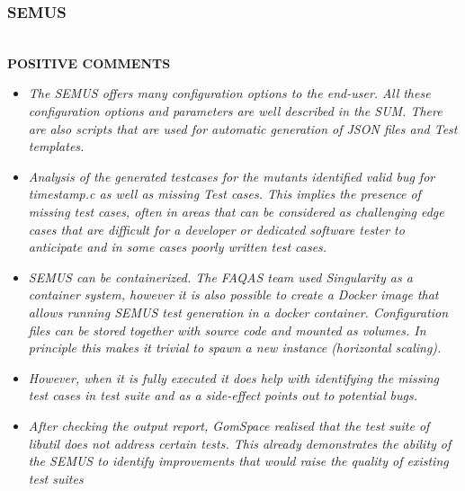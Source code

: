 \subsubsection{SEMUS} \ \\



\textbf{POSITIVE COMMENTS}

\begin{itemize}
\item \emph{The SEMUS offers many configuration options to the end-user. All these configuration options and parameters are well described in the SUM. There are also scripts that are used for automatic generation of JSON files and Test templates.}



\item \emph{Analysis of the generated testcases for the mutants identified valid bug for timestamp.c as well as missing Test cases. This implies the presence of missing test cases, often in areas that can be considered as challenging edge cases that are difficult for a developer or dedicated software tester to anticipate and in some cases poorly written test cases.}

\item \emph{SEMUS can be containerized. The FAQAS team used Singularity as a container system, however it is also possible to create a Docker image that allows running SEMUS test generation in a docker container. Configuration files can be stored together with source code and mounted as volumes. In principle this makes it trivial to spawn a new instance (horizontal scaling).}

\item \emph{However, when it is fully executed it does help with identifying the missing test cases in test suite and as a side-effect points out to potential bugs.}

\item \emph{After checking the output report, GomSpace realised that the test suite of libutil does not address certain tests. This already demonstrates the ability of the SEMUS to identify improvements that would raise the quality of existing test suites }
\end{itemize}




